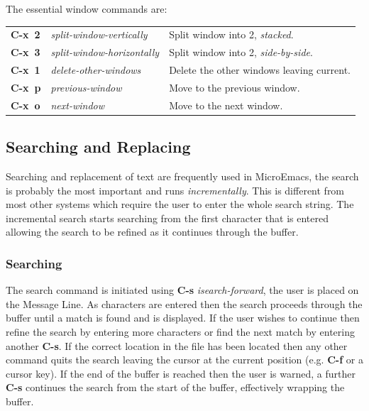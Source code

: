 \documentclass[11pt,a4paper,pdftex]{article}
\begin{document}
  The essential window commands are:

  \begin{longtable}{ll@{\ --\ }l}
    \endhead
    \endfoot
    \endlastfoot
    \textbf{C-x~2} & \textit{split-window-vertically} &
    Split window into 2, \textit{stacked}.\\
    \textbf{C-x~3} & \textit{split-window-horizontally} &
    Split window into 2, \textit{side-by-side}.\\
    \textbf{C-x~1} & \textit{delete-other-windows} &
    Delete the other windows leaving current.\\
    \textbf{C-x~p} & \textit{previous-window} &
    Move to the previous window.\\
    \textbf{C-x~o} & \textit{next-window} &
    Move to the next window.\\
  \end{longtable}

\subsection{Searching and Replacing}

  Searching and replacement of text are frequently used in MicroEmacs, the
  search is probably the most important and runs \textit{incrementally}. This
  is different from most other systems which require the user to enter the
  whole search string. The incremental search starts searching from the first
  character that is entered allowing the search to be refined as it continues
  through the buffer.

\subsubsection{Searching}

  The search command is initiated using \textbf{C-s} \textit{isearch-forward},
  the user is placed on the Message Line. As characters are entered then the
  search proceeds through the buffer until a match is found and is displayed.
  If the user wishes to continue then refine the search by entering more
  characters or find the next match by entering another \textbf{C-s}. If the
  correct location in the file has been located then any other command quits
  the search leaving the cursor at the current position (e.g. \textbf{C-f} or
  a cursor key). If the end of the buffer is reached then the user is warned,
  a further \textbf{C-s} continues the search from the start of the buffer,
  effectively wrapping the buffer.
\end{document}
